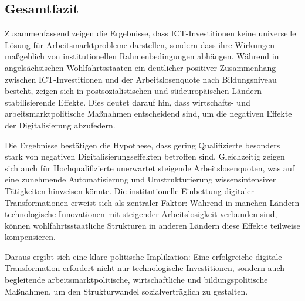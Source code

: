 
\subsection{Gesamtfazit}

Zusammenfassend zeigen die Ergebnisse, dass \ac{ICT}-Investitionen keine universelle Lösung für 
Arbeitsmarktprobleme darstellen, sondern dass ihre Wirkungen maßgeblich von institutionellen 
Rahmenbedingungen abhängen. Während in angelsächsischen Wohlfahrtsstaaten ein deutlicher 
positiver Zusammenhang zwischen \ac{ICT}-Investitionen und der Arbeitslosenquote nach 
Bildungsniveau besteht, zeigen sich in postsozialistischen und südeuropäischen Ländern 
stabilisierende Effekte. Dies deutet darauf hin, dass wirtschafts- und arbeitsmarktpolitische 
Maßnahmen entscheidend sind, um die negativen Effekte der Digitalisierung abzufedern.

Die Ergebnisse bestätigen die Hypothese, dass gering Qualifizierte besonders stark von negativen 
Digitalisierungseffekten betroffen sind. Gleichzeitig zeigen sich auch für Hochqualifizierte 
unerwartet steigende Arbeitslosenquoten, was auf eine zunehmende Automatisierung und 
Umstrukturierung wissensintensiver Tätigkeiten hinweisen könnte. Die institutionelle Einbettung 
digitaler Transformationen erweist sich als zentraler Faktor: Während in manchen Ländern 
technologische Innovationen mit steigender Arbeitslosigkeit verbunden sind, können 
wohlfahrtsstaatliche Strukturen in anderen Ländern diese Effekte teilweise kompensieren.

Daraus ergibt sich eine klare politische Implikation: Eine erfolgreiche digitale Transformation 
erfordert nicht nur technologische Investitionen, sondern auch begleitende 
arbeitsmarktpolitische, wirtschaftliche und bildungspolitische Maßnahmen, um den Strukturwandel 
sozialverträglich zu gestalten.
